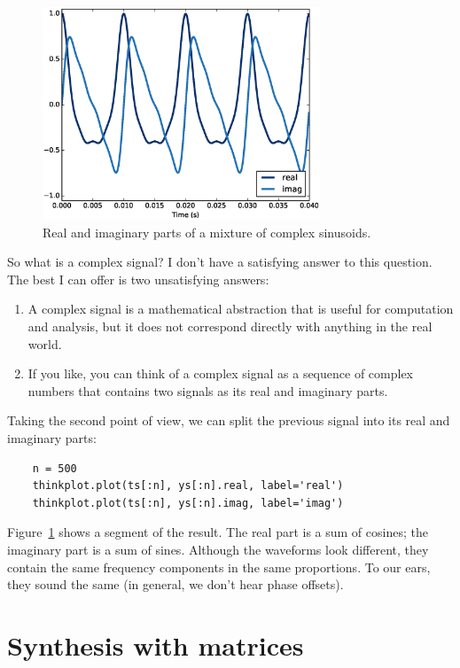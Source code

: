 \documentclass[12pt]{book}
\begin{document}
\begin{figure}
\centerline{\includegraphics[height=2.5in]{figs/dft1.eps}}
\caption{Real and imaginary parts of a mixture of complex sinusoids.}
\label{fig.dft1}
\end{figure}

So what is a complex signal?  I don't have a satisfying answer to this
question.  The best I can offer is two unsatisfying
answers:

\begin{enumerate}

\item A complex signal is a mathematical abstraction that is useful
  for computation and analysis, but it does not correspond directly
  with anything in the real world.

\item If you like, you can think of a complex signal as a sequence of
  complex numbers that contains two signals as its real and imaginary
  parts.

\end{enumerate}

Taking the second point of view, we can split the previous
signal into its real and imaginary parts:

\begin{verbatim}
    n = 500
    thinkplot.plot(ts[:n], ys[:n].real, label='real')
    thinkplot.plot(ts[:n], ys[:n].imag, label='imag')
\end{verbatim}

Figure~\ref{fig.dft1} shows a segment of the result.  The
real part is a sum of cosines; the imaginary part is
a sum of sines.  Although the waveforms look different, they
contain the same frequency components in the same proportions.
To our ears, they sound the same (in general, we don't hear
phase offsets).


\section{Synthesis with matrices}
\label{synthmat}
\end{document}

